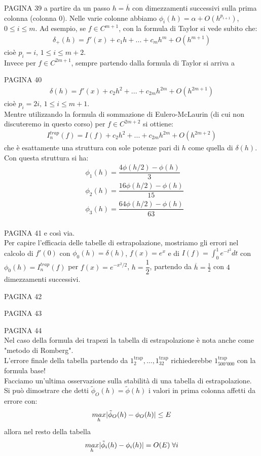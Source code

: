 \documentclass[12pt,a4paper]{article}
\DeclarePairedDelimiter{\abs}{\lvert}{\rvert}
\begin{document}
PAGINA 39 %
a partire da un passo $h=\overline{h}$ con dimezzamenti successivi sulla prima colonna (colonna $0$). Nelle varie colonne abbiamo $\phi_i(h)=\alpha + O(h^{p_{i+1}})$, $0\leq i \leq m$.
Ad esempio, se $f \in C^{m+1}$, con la formula di Taylor si vede subito che:
\[ \begin{split}
	\delta_+ (h)=f'(x)+c_1h+...+c_mh^m+O(h^{m+1})
\end{split} \]
cioè $p_i=i, \, 1 \leq i \leq m+2$.\\
Invece per $f \in C^{2m+1}$, sempre partendo dalla formula di Taylor si arriva a 

PAGINA 40 %
\[ \begin{split}
	\delta (h)=f'(x)+c_2h^2+...+c_{2m}h^{2m}+O(h^{2m+1})
\end{split} \]
cioè $p_i=2i, \, 1 \leq i \leq m+1$.\\
Mentre utilizzando la formula di sommazione di Eulero-McLaurin (di cui non discuteremo in questo corso) per $f \in C^{2m+2}$ si ottiene:
\[ \begin{split}
	I_n^{trap} (f)=I(f)+c_2h^2+...+c_{2m}h^{2m}+O(h^{2m+2})
\end{split} \]
che è esattamente una struttura con sole potenze pari di $h$ come quella di $\delta(h)$. Con questa struttura si ha:
\[ \begin{split}
	& \phi_1(h)=\dfrac{4 \phi(h/2)-\phi(h)}{3}\\
	& \phi_2(h)=\dfrac{16 \phi(h/2)-\phi(h)}{15}\\
	& \phi_3(h)=\dfrac{64 \phi(h/2)-\phi(h)}{63}\\
\end{split} \]


PAGINA 41 %
e così via.\\
Per capire l'efficacia delle tabelle di estrapolazione, mostriamo gli errori nel calcolo di $f'(0)$ con $\phi_0(h)=\delta (h)$, $f(x)=e^x$ e di $I(f)=\int_0^1 e^{-t^2} dt$ con $\phi_0(h)=I_n^{trap} (f)$ per $f(x)=e^{-x^2/2}$, $h=\dfrac{1}{2}$, partendo da $\overline{h}=\frac{1}{2}$ con $4$ dimezzamenti successivi.


PAGINA 42


PAGINA 43 


PAGINA 44%
\\
Nel caso della formula dei trapezi la tabella di estrapolazione è nota anche come "metodo di Romberg".\\
L'errore finale della tabella partendo da $1_2^{\text{trap}},...,1_{32}^{\text{trap}}$ richiederebbe $1_{500'000}^{\text{trap}}$ con la formula base!\\
Facciamo un'ultima osservazione sulla stabilità di una tabella di estrapolazione.\\
Si può dimostrare che detti $\tilde{\phi}_O(h)=\tilde{\phi}(h)$ i valori in prima colonna affetti da errore con:
\begin{equation*}
    \underset{h}{max} \abs{\tilde{\phi}_O(h)-\phi_O(h)} \leq E
\end{equation*}
allora nel resto della tabella 
\begin{equation*}
    \underset{h}{max} \abs{\tilde{\phi}_i(h)-\phi_i(h)} = O(E) \; \forall i 
\end{equation*}
\end{document}
